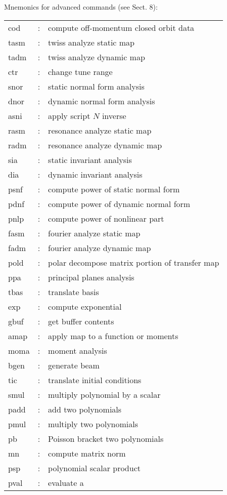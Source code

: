 \begin{table} Mnemonics for advanced commands (see Sect. 8):

\begin{center}
\begin{tabular}{lll} cod &: & compute off-momentum closed orbit data\\ tasm
&: & twiss analyze static map\\ tadm &: & twiss analyze dynamic map\\ ctr
&: & change tune range\\ snor &: & static normal form analysis\\ dnor &: &
dynamic normal form analysis\\ asni &: & apply script $N$ inverse\\ rasm &:
& resonance analyze static map\\ radm &: & resonance analyze dynamic map\\
sia &: & static invariant analysis\\ dia &: & dynamic invariant analysis\\
psnf &: & compute power of static normal form\\ pdnf &: & compute power of
dynamic normal form\\ pnlp &: & compute power of nonlinear part\\ fasm
&: & fourier analyze static map\\ fadm &: & fourier analyze dynamic map\\
pold &: & polar decompose matrix portion of transfer map\\ ppa &: &
principal planes analysis\\ tbas &: & translate basis\\ exp &: & compute
exponential\\ gbuf &: & get buffer contents\\ amap &: & apply map to a
function or moments\\ moma &: & moment analysis\\ bgen &: & generate beam\\
tic &: & translate initial conditions\\ smul &: & multiply polynomial by a
scalar\\ padd &: & add two polynomials\\ pmul &: & multiply two
polynomials\\ pb &: & Poisson bracket two polynomials\\ mn &: & compute
matrix norm\\ psp &: & polynomial scalar product\\ pval &: & evaluate a

\end{tabular}
\end{center}
\end{table}
